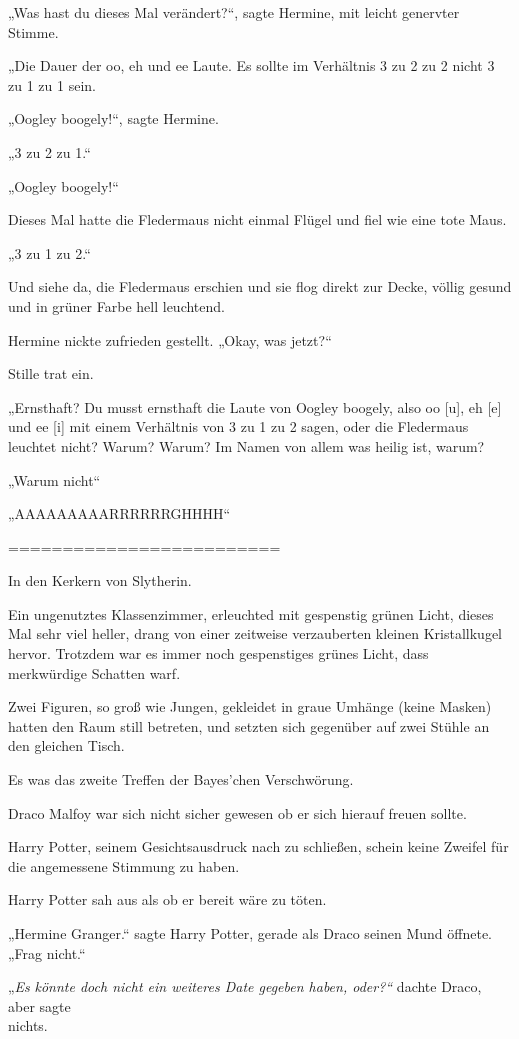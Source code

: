 {„Was hast du dieses Mal verändert?“, sagte Hermine, mit leicht genervter Stimme.

„Die Dauer der oo, eh und ee Laute. Es sollte im Verhältnis 3 zu 2 zu 2 nicht 3 zu 1 zu 1 sein.

„Oogley boogely!“, sagte Hermine.

„3 zu 2 zu 1.“

„Oogley boogely!“

Dieses Mal hatte die Fledermaus nicht einmal Flügel und fiel wie eine tote Maus.

„3 zu 1 zu 2.“

Und siehe da, die Fledermaus erschien und sie flog direkt zur Decke, völlig gesund und in grüner Farbe hell leuchtend.

Hermine nickte zufrieden gestellt. „Okay, was jetzt?“

Stille trat ein.

„Ernsthaft? Du musst ernsthaft die Laute von Oogley boogely, also oo {[}u{]}, eh {[}e{]} und ee {[}i{]} mit einem Verhältnis von 3 zu 1 zu 2 sagen, oder die Fledermaus leuchtet nicht? Warum? Warum? Im Namen von allem was heilig ist, warum?

„Warum nicht“

„AAAAAAAAARRRRRRGHHHH“

=========================

In den Kerkern von Slytherin.

Ein ungenutztes Klassenzimmer, erleuchted mit gespenstig grünen Licht, dieses Mal sehr viel heller, drang von einer zeitweise verzauberten kleinen Kristallkugel hervor. Trotzdem war es immer noch gespenstiges grünes Licht, dass merkwürdige Schatten warf.

Zwei Figuren, so groß wie Jungen, gekleidet in graue Umhänge (keine Masken) hatten den Raum still betreten, und setzten sich gegenüber auf zwei Stühle an den gleichen Tisch.

Es was das zweite Treffen der Bayes'chen Verschwörung.

Draco Malfoy war sich nicht sicher gewesen ob er sich hierauf freuen sollte.

Harry Potter, seinem Gesichtsausdruck nach zu schließen, schein keine Zweifel für die angemessene Stimmung zu haben.

Harry Potter sah aus als ob er bereit wäre zu töten.

„Hermine Granger.“ sagte Harry Potter, gerade als Draco seinen Mund öffnete. „Frag nicht.“

„\emph{Es} \emph{könnte doch nicht ein weiteres Date gegeben haben, oder?“} dachte Draco, aber sagte\\ nichts.

}
